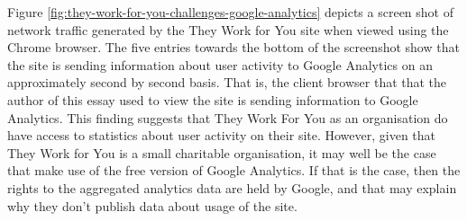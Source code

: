 Figure \ref{fig:they-work-for-you-challenges-google-analytics} depicts a screen shot of network traffic generated by the They Work for You site when viewed using the Chrome browser.
The five entries towards the bottom of the screenshot show that the site is sending information about user activity to Google Analytics \cite{google-analytics} on an approximately second by second basis.
That is, the client browser that that the author of this essay used to view the site is sending information to Google Analytics.
This finding suggests that They Work For You as an organisation do have access to statistics about user activity on their site.
However, given that They Work for You is a small charitable organisation, it may well be the case that make use of the free version of Google Analytics.
If that is the case, then the rights to the aggregated analytics data are held by Google, and that may explain why they don’t publish data about usage of the site.
